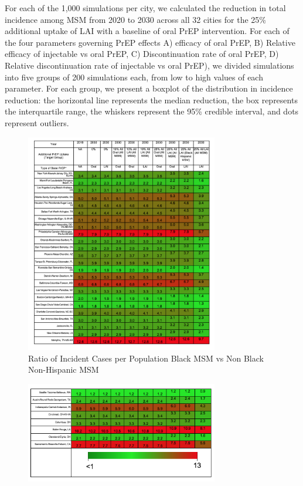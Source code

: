 \documentclass{article}
\begin{document}
For each of the 1,000 simulations per city, we calculated the reduction in total incidence among MSM from 2020 to 2030 across all 32 cities for the 25\% additional uptake of LAI with a baseline of oral PrEP intervention. For each of the four parameters governing PrEP effects A) efficacy of oral PrEP, B) Relative efficacy of injectable vs oral PrEP, C) Discontinuation rate of oral PrEP, D) Relative discontinuation rate of injectable vs oral PrEP), we divided simulations into five groups of 200 simulations each, from low to high values of each parameter. For each group, we present a boxplot of the distribution in incidence reduction: the horizontal line represents the median reduction, the box represents the interquartile range, the whiskers represent the 95\% credible interval, and dots represent outliers. 

\begin{figure}[H]
	\centering
	\caption{Ratio of Incident Cases per Population Black MSM vs Non Black Non-Hispanic MSM }
	\includegraphics[width=0.75\textwidth]{images/FigureS6_1}

\end{figure}

\pagebreak

\begin{figure}[H]
	\centering
	\includegraphics[width=0.75\textwidth]{images/FigureS6_2}
\end{figure}
\end{document}
